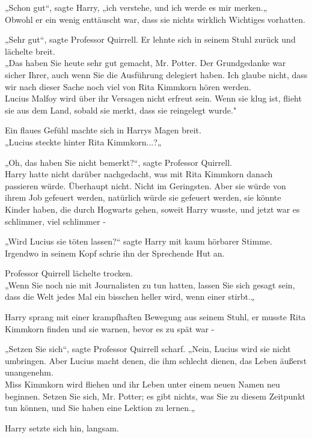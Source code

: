 {„Schon gut“, sagte Harry, „ich verstehe, und ich werde es mir merken.„\\ Obwohl er ein wenig enttäuscht war, dass sie nichts wirklich Wichtiges vorhatten.

„Sehr gut“, sagte Professor Quirrell. Er lehnte sich in seinem Stuhl zurück und lächelte breit.\\ „Das haben Sie heute sehr gut gemacht, Mr. Potter. Der Grundgedanke war sicher Ihrer, auch wenn Sie die Ausführung delegiert haben. Ich glaube nicht, dass wir nach dieser Sache noch viel von Rita Kimmkorn hören werden.\\ Lucius Malfoy wird über ihr Versagen nicht erfreut sein. Wenn sie klug ist, flieht sie aus dem Land, sobald sie merkt, dass sie reingelegt wurde."

Ein flaues Gefühl machte sich in Harrys Magen breit.\\ „Lucius steckte hinter Rita Kimmkorn...?„

„Oh, das haben Sie nicht bemerkt?“, sagte Professor Quirrell.\\ Harry hatte nicht darüber nachgedacht, was mit Rita Kimmkorn danach passieren würde. Überhaupt nicht. Nicht im Geringsten. Aber sie würde von ihrem Job gefeuert werden, natürlich würde sie gefeuert werden, sie könnte Kinder haben, die durch Hogwarts gehen, soweit Harry wusste, und jetzt war es schlimmer, viel schlimmer -

„Wird Lucius sie töten lassen?“ sagte Harry mit kaum hörbarer Stimme.\\ Irgendwo in seinem Kopf schrie ihn der Sprechende Hut an.

Professor Quirrell lächelte trocken.\\ „Wenn Sie noch nie mit Journalisten zu tun hatten, lassen Sie sich gesagt sein, dass die Welt jedes Mal ein bisschen heller wird, wenn einer stirbt.„

Harry sprang mit einer krampfhaften Bewegung aus seinem Stuhl, er musste Rita Kimmkorn finden und sie warnen, bevor es zu spät war -

„Setzen Sie sich“, sagte Professor Quirrell scharf. „Nein, Lucius wird sie nicht umbringen. Aber Lucius macht denen, die ihm schlecht dienen, das Leben äußerst unangenehm.\\ Miss Kimmkorn wird fliehen und ihr Leben unter einem neuen Namen neu beginnen. Setzen Sie sich, Mr. Potter; es gibt nichts, was Sie zu diesem Zeitpunkt tun können, und Sie haben eine Lektion zu lernen.„

Harry setzte sich hin, langsam.

}
